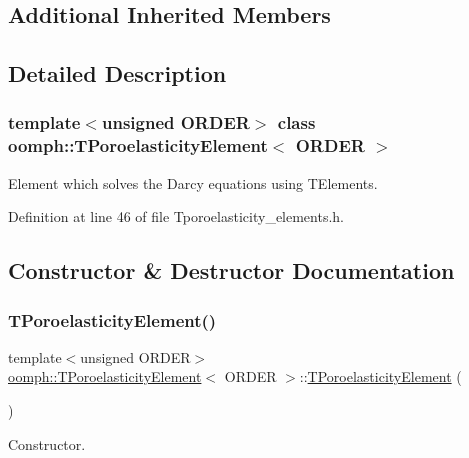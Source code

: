 \subsection*{Additional Inherited Members}


\subsection{Detailed Description}
\subsubsection*{template$<$unsigned O\+R\+D\+ER$>$\newline
class oomph\+::\+T\+Poroelasticity\+Element$<$ O\+R\+D\+E\+R $>$}

Element which solves the Darcy equations using T\+Elements. 

Definition at line 46 of file Tporoelasticity\+\_\+elements.\+h.



\subsection{Constructor \& Destructor Documentation}
\mbox{\label{classoomph_1_1TPoroelasticityElement_a12d7d5e9fe2723d0644d0a49e73b594b}} 
\subsubsection{\texorpdfstring{T\+Poroelasticity\+Element()}{TPoroelasticityElement()}\hspace{0.1cm}{\footnotesize\ttfamily [1/3]}}
{\footnotesize\ttfamily template$<$unsigned O\+R\+D\+ER$>$ \\
\hyperlink{classoomph_1_1TPoroelasticityElement}{oomph\+::\+T\+Poroelasticity\+Element}$<$ O\+R\+D\+ER $>$\+::\hyperlink{classoomph_1_1TPoroelasticityElement}{T\+Poroelasticity\+Element} (\begin{DoxyParamCaption}{ }\end{DoxyParamCaption})}



Constructor. 

